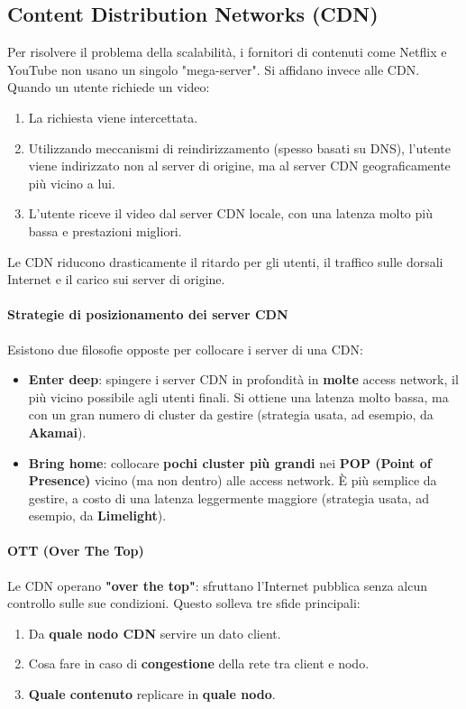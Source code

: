 \subsection{Content Distribution Networks (CDN)}
Per risolvere il problema della scalabilità, i fornitori di contenuti come Netflix e YouTube non usano un singolo "mega-server". Si affidano invece alle CDN.
Quando un utente richiede un video:
\begin{enumerate}
    \item La richiesta viene intercettata.
    \item Utilizzando meccanismi di reindirizzamento (spesso basati su DNS), l'utente viene indirizzato non al server di origine, ma al server CDN geograficamente più vicino a lui.
    \item L'utente riceve il video dal server CDN locale, con una latenza molto più bassa e prestazioni migliori.
\end{enumerate}
Le CDN riducono drasticamente il ritardo per gli utenti, il traffico sulle dorsali Internet e il carico sui server di origine.

\paragraph{Strategie di posizionamento dei server CDN}
Esistono due filosofie opposte per collocare i server di una CDN:
\begin{itemize}
    \item \textbf{Enter deep}: spingere i server CDN in profondità in \textbf{molte} access network, il più vicino possibile agli utenti finali. Si ottiene una latenza molto bassa, ma con un gran numero di cluster da gestire (strategia usata, ad esempio, da \textbf{Akamai}).
    \item \textbf{Bring home}: collocare \textbf{pochi cluster più grandi} nei \textbf{POP (Point of Presence)} vicino (ma non dentro) alle access network. È più semplice da gestire, a costo di una latenza leggermente maggiore (strategia usata, ad esempio, da \textbf{Limelight}).
\end{itemize}

\paragraph{OTT (Over The Top)}
Le CDN operano \textbf{"over the top"}: sfruttano l'Internet pubblica senza alcun controllo sulle sue condizioni. Questo solleva tre sfide principali:
\begin{enumerate}
    \item Da \textbf{quale nodo CDN} servire un dato client.
    \item Cosa fare in caso di \textbf{congestione} della rete tra client e nodo.
    \item \textbf{Quale contenuto} replicare in \textbf{quale nodo}.
\end{enumerate}

